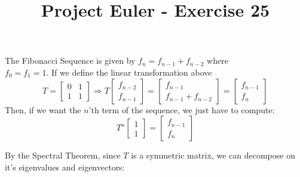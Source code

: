 \documentclass{article}
\title{Project Euler - Exercise 25}
\date{}
\begin{document}
\maketitle
The Fibonacci Sequence is given by $f_n = f_{n - 1} + f_{n - 2}$
where\\ $f_0= f_1 = 1$.
If we define the linear transformation above
\begin{equation*}
    T =
    \begin{bmatrix}
        0 & 1\\
        1 & 1
    \end{bmatrix} \Rightarrow
    T \begin{bmatrix}
        f_{n - 2} \\
        f_{n - 1}
    \end{bmatrix} =
    \begin{bmatrix}
        f_{n - 1} \\
        f_{n - 1} + f_{n - 2}
    \end{bmatrix} =
    \begin{bmatrix}
        f_{n - 1} \\
        f_{n}
    \end{bmatrix}
\end{equation*}
Then, if we want the $n$'th term of the sequence, we just have to compute:
\begin{equation*}
    T^n\begin{bmatrix}
        1 \\
        1
    \end{bmatrix} = \begin{bmatrix}
        f_{n - 1}\\
        f_n
    \end{bmatrix}
\end{equation*}

By the Spectral Theorem, since $T$ is a symmetric matrix, we can decompose on
it's eigenvalues and eigenvectors:
\end{document}
